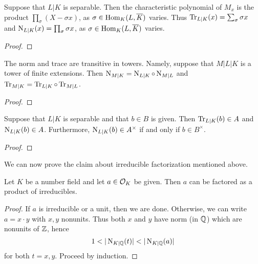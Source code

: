 \begin{proposition}\label{proposition:norm_trace_formula_embeddings}
  Suppose that $L|K$ is separable.
  Then the characteristic polynomial of $M_{x}$ is the product $\prod_{\sigma} (X - \sigma x)$, as $\sigma \in \operatorname{Hom}_{K}(L,\overline K)$ varies.
  Thus $\operatorname{Tr}_{L|K}(x) = \sum_{\sigma} \sigma x$ and $\operatorname{N}_{L|K}(x) = \prod_{\sigma} \sigma x$, as $\sigma \in \operatorname{Hom}_{K}(L,\overline K)$ varies.
\end{proposition}
\begin{proof}
\end{proof}

\begin{lemma}
  The norm and trace are transitive in towers.
  Namely, suppose that $M|L|K$ is a tower of finite extensions.
  Then $\operatorname{N}_{M|K} = \operatorname{N}_{L|K} \circ \operatorname{N}_{M|L}$ and $\operatorname{Tr}_{M|K} = \operatorname{Tr}_{L|K} \circ \operatorname{Tr}_{M|L}$.
\end{lemma}
\begin{proof}
\end{proof}

\begin{lemma}
  Suppose that $L|K$ is separable and that $b \in B$ is given.
  Then $\operatorname{Tr}_{L|K}(b) \in A$ and $\operatorname{N}_{L|K}(b) \in A$.
  Furthermore, $\operatorname{N}_{L|K}(b) \in A^{\times}$ if and only if $b \in B^{\times}$.
\end{lemma}
\begin{proof}
\end{proof}

We can now prove the claim about irreducible factorization mentioned above.
\begin{lemma}
  Let $K$ be a number field and let $a \in \mathcal{O}_{K}$ be given.
  Then $a$ can be factored as a product of irreducibles.
\end{lemma}
\begin{proof}
  If $a$ is irreducible or a unit, then we are done.
  Otherwise, we can write $a = x \cdot y$ with $x,y$ nonunits.
  Thus both $x$ and $y$ have norm (in $\mathbb{Q}$) which are nonunits of $\mathbb{Z}$, hence
  \[ 1 < |\operatorname{N}_{K|\mathbb{Q}}(t)| < |\operatorname{N}_{K|\mathbb{Q}}(a)| \]
  for both $t = x,y$.
  Proceed by induction.
\end{proof}

